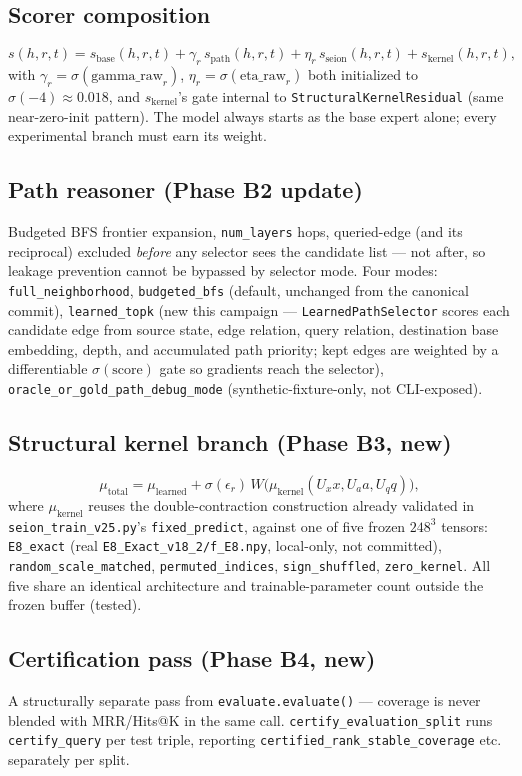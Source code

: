 \documentclass[11pt]{article}
\begin{document}
\subsection{Scorer composition}
\[
  s(h,r,t) = s_{\text{base}}(h,r,t) + \gamma_r\, s_{\text{path}}(h,r,t) + \eta_r\, s_{\text{seion}}(h,r,t) + s_{\text{kernel}}(h,r,t),
\]
with $\gamma_r = \sigma(\text{gamma\_raw}_r)$, $\eta_r = \sigma(\text{eta\_raw}_r)$ both initialized
to $\sigma(-4)\approx 0.018$, and $s_{\text{kernel}}$'s gate internal to
\texttt{StructuralKernelResidual} (same near-zero-init pattern). The model always starts as the
base expert alone; every experimental branch must earn its weight.

\subsection{Path reasoner (Phase B2 update)}
Budgeted BFS frontier expansion, \texttt{num\_layers} hops, queried-edge (and its reciprocal)
excluded \emph{before} any selector sees the candidate list --- not after, so leakage prevention
cannot be bypassed by selector mode. Four modes: \texttt{full\_neighborhood},
\texttt{budgeted\_bfs} (default, unchanged from the canonical commit), \texttt{learned\_topk} (new
this campaign --- \texttt{LearnedPathSelector} scores each candidate edge from source state, edge
relation, query relation, destination base embedding, depth, and accumulated path priority; kept
edges are weighted by a differentiable $\sigma(\text{score})$ gate so gradients reach the selector),
\texttt{oracle\_or\_gold\_path\_debug\_mode} (synthetic-fixture-only, not CLI-exposed).

\subsection{Structural kernel branch (Phase B3, new)}
\[
  \mu_{\text{total}} = \mu_{\text{learned}} + \sigma(\epsilon_r)\, W\big(\mu_{\text{kernel}}(U_x x, U_a a, U_q q)\big),
\]
where $\mu_{\text{kernel}}$ reuses the double-contraction construction already validated in
\texttt{seion\_train\_v25.py}'s \texttt{fixed\_predict}, against one of five frozen $248^3$
tensors: \texttt{E8\_exact} (real \texttt{E8\_Exact\_v18\_2/f\_E8.npy}, local-only, not committed),
\texttt{random\_scale\_matched}, \texttt{permuted\_indices}, \texttt{sign\_shuffled},
\texttt{zero\_kernel}. All five share an identical architecture and trainable-parameter count
outside the frozen buffer (tested).

\subsection{Certification pass (Phase B4, new)}
A structurally separate pass from \texttt{evaluate.evaluate()} --- coverage is never blended with
MRR/Hits@K in the same call. \texttt{certify\_evaluation\_split} runs
\texttt{certify\_query} per test triple, reporting \texttt{certified\_rank\_stable\_coverage} etc.
separately per split.
\end{document}
